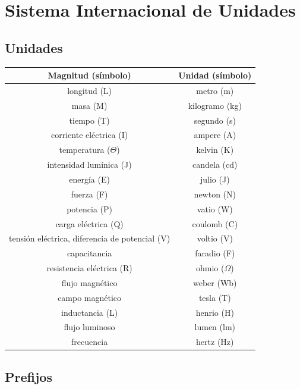\section{Sistema Internacional de Unidades}
\subsection{Unidades}

\begin{tabular}{|c|c|}
\hline 
Magnitud (símbolo) & Unidad (símbolo) \\ 
\hline 
longitud (L) & metro (m) \\ 
\hline 
masa (M) & kilogramo (kg) \\ 
\hline 
tiempo (T) & segundo (s) \\ 
\hline 
corriente eléctrica (I) & ampere (A) \\ 
\hline 
temperatura ($ \Theta $) & kelvin (K) \\ 
\hline 
intensidad lumínica (J) & candela (cd) \\ 
\hline 
energía (E) & julio (J) \\ 
\hline 
fuerza (F) & newton (N) \\ 
\hline 
potencia (P) & vatio (W) \\ 
\hline 
carga eléctrica (Q) & coulomb (C) \\ 
\hline 
tensión eléctrica, diferencia de potencial (V) & voltio (V) \\ 
\hline 
capacitancia & faradio (F) \\ 
\hline 
resistencia eléctrica (R) & ohmio ($ \Omega $) \\ 
\hline 
flujo magnético & weber (Wb) \\ 
\hline 
campo magnético & tesla (T) \\ 
\hline 
inductancia (L) & henrio (H) \\ 
\hline 
flujo luminoso & lumen (lm) \\ 
\hline
frecuencia & hertz (Hz) \\ 
\hline
\end{tabular} 

\subsection{Prefijos}\label{section:prefijos}

